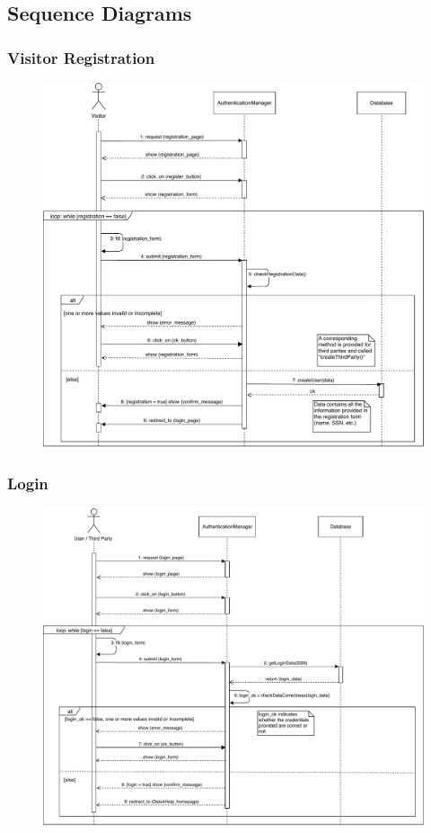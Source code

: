 \documentclass[12pt,a4paper]{article}
\begin{document}
	\subsection{Sequence Diagrams}
		\subsubsection{Visitor Registration}
			\begin{figure}[H]
				\centering
				\includegraphics[width=1.0\linewidth]{Images/registration_sequence}
				\label{fig:registration_sequence}
			\end{figure}
		\subsubsection{Login}
		\begin{figure}[H]
			\centering
			\includegraphics[width=1.0\linewidth]{Images/login_sequence}
			\label{fig:login_sequence}
		\end{figure}
\end{document}

